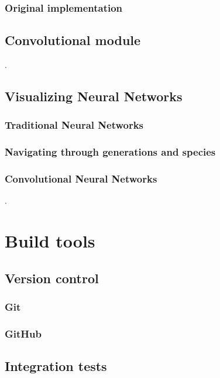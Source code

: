 \documentclass[11pt]{article}
\begin{document}
			\subsubsection{Original implementation}
				
		\subsection{Convolutional module}
		    .
        \subsection{Visualizing Neural Networks}
			\subsubsection{Traditional Neural Networks}
		    	
		    \subsubsection{Navigating through generations and species}
			    
			\subsubsection{Convolutional Neural Networks}
	            .
    \newpage

	\section{Build tools}
		\subsection{Version control}
			
			\subsubsection{Git}
				
			\subsubsection{GitHub}
				
		\subsection{Integration tests}
			
\end{document}
